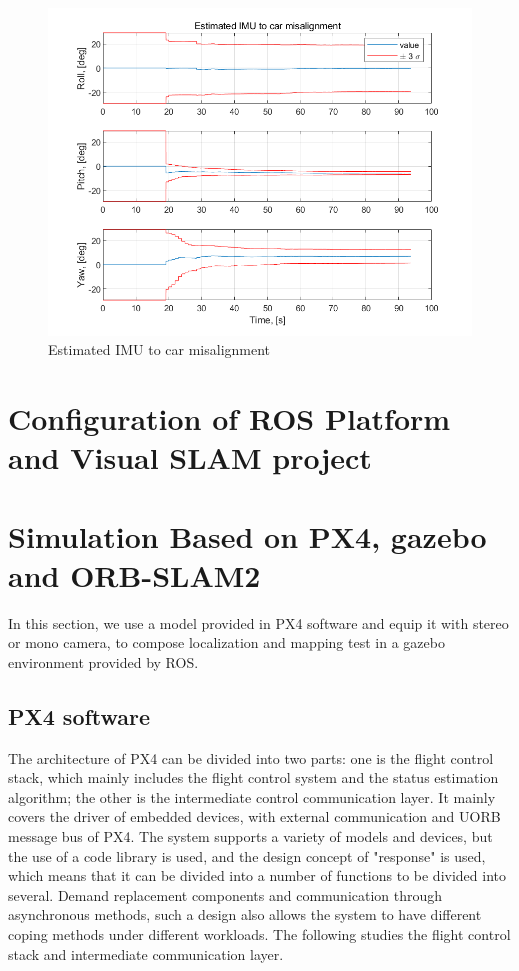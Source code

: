 \documentclass[conference]{IEEEtran}
\begin{document}
\begin{figure}[htbp]
    \centerline{\includegraphics[width=1.0\columnwidth]{fig27.png}}
    \caption{Estimated IMU to car misalignment}
\end{figure}


\section{Configuration of ROS Platform and Visual SLAM project}

\section{Simulation Based on PX4, gazebo and ORB-SLAM2}

In this section, we use a model provided in PX4 software and equip it with stereo or mono camera,
to compose localization and mapping test in a gazebo environment provided by ROS.

\subsection{PX4 software}
The architecture of PX4 can be divided into two parts: one is the flight control stack, 
which mainly includes the flight control system and the status estimation algorithm; 
the other is the intermediate control communication layer. 
It mainly covers the driver of embedded devices, 
with external communication and UORB message bus of PX4. 
The system supports a variety of models and devices, 
but the use of a code library is used, and the design concept of "response" is used, 
which means that it can be divided into a number of functions to be divided into several. 
Demand replacement components and communication through asynchronous methods, 
such a design also allows the system to have different coping methods under different workloads. 
The following studies the flight control stack and intermediate communication layer.
\end{document}
